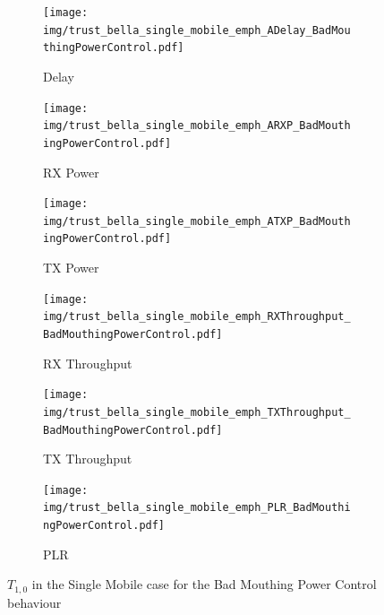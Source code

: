 \documentclass[runningheads,a4paper]{llncs}
\begin{document}
\begin{figure}
\begin{subfigure}{0.32\textwidth}
  \centering
  \texttt{[image: img/trust\_bella\_single\_mobile\_emph\_ADelay\_BadMouthingPowerControl.pdf]}
  \caption{Delay}
  \label{fig:single_mobile_badmouthing_delay}
\end{subfigure}
\begin{subfigure}{0.32\textwidth}
\centering
  \texttt{[image: img/trust\_bella\_single\_mobile\_emph\_ARXP\_BadMouthingPowerControl.pdf]}
  \caption{RX Power}
  \label{fig:single_mobile_badmouthing_rxp}
\end{subfigure}
\begin{subfigure}{0.32\textwidth}
\centering
  \texttt{[image: img/trust\_bella\_single\_mobile\_emph\_ATXP\_BadMouthingPowerControl.pdf]}
  \caption{TX Power}
  \label{fig:single_mobile_badmouthing_txp}
\end{subfigure}
\begin{subfigure}{0.32\textwidth}
\centering
  \texttt{[image: img/trust\_bella\_single\_mobile\_emph\_RXThroughput\_BadMouthingPowerControl.pdf]}
  \caption{RX Throughput}
  \label{fig:single_mobile_badmouthing_rxthroughput}
\end{subfigure}
\begin{subfigure}{0.32\textwidth}
\centering
  \texttt{[image: img/trust\_bella\_single\_mobile\_emph\_TXThroughput\_BadMouthingPowerControl.pdf]}
  \caption{TX Throughput}
  \label{fig:single_mobile_badmouthing_txthroughput}
\end{subfigure}
\begin{subfigure}{0.32\textwidth}
\centering
  \texttt{[image: img/trust\_bella\_single\_mobile\_emph\_PLR\_BadMouthingPowerControl.pdf]}
  \caption{PLR}
  \label{fig:single_mobile_badmouthing_plr}
\end{subfigure}
\caption{$T_{1,0}$ in the Single Mobile case for the Bad Mouthing Power Control behaviour}
\label{fig:single_mobile_badmouthing}
\end{figure}
\end{document}
